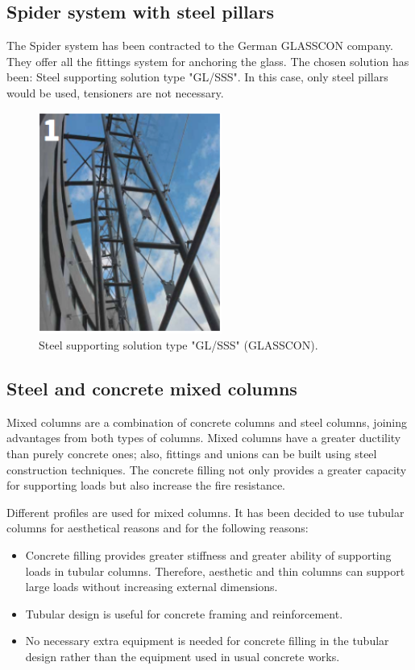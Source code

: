 	
	
		\subsection{Spider system with steel pillars}
	The Spider system has been contracted to the German GLASSCON company. They offer all the fittings system for anchoring the glass. The chosen solution has been: Steel supporting solution type "GL/SSS". In this case, only steel pillars would be used, tensioners are not necessary.
	
	\begin{figure}[H]
\centering
\includegraphics[width=6cm]{./images/Facade/steel}
\caption{Steel supporting solution type "GL/SSS" (GLASSCON).}
\end{figure}
	
		\subsection{Steel and concrete mixed columns}
	Mixed columns are a combination of concrete columns and steel columns, joining advantages from both types of columns. Mixed columns have a greater ductility than purely concrete ones; also, fittings and unions can be built using steel construction techniques. The concrete filling not only provides a greater capacity for supporting loads but also increase the fire resistance.
	
	Different profiles are used for mixed columns. It has been decided to use tubular columns for aesthetical reasons and for the following reasons:
	
\begin{itemize}
\item Concrete filling provides greater stiffness and greater ability of supporting loads in tubular columns. Therefore, aesthetic and thin columns can support large loads without increasing external dimensions.
\item Tubular design is useful for concrete framing and reinforcement.
\item No necessary extra equipment is needed for concrete filling in the tubular design rather than the equipment used in usual concrete works.
\end{itemize}
	
